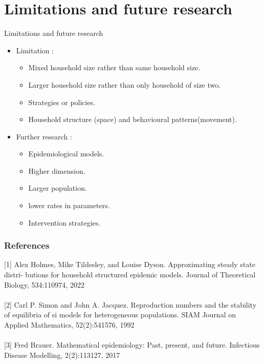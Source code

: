 \documentclass[smaller,aspectratio=169, toc=bibliography]{beamer}
\begin{document}
\section*{Limitations and future research}
\begin{frame}{Limitations and future research}
\begin{itemize}
\item Limitation : 
\begin{itemize}
\item Mixed household size rather than same household size. 
\item Larger household size rather than only household of size two. 
\item Strategies or policies. 
\item Household structure (space) and behavioural patterns(movement).  
\end{itemize}
\item Further research : 
\begin{itemize}
\item Epidemiological models. 
\item Higher dimension. 
\item Larger population. 
\item lower rates in parameters. 
\item Intervention strategies.
\end{itemize}
\end{itemize}
\end{frame}


\begin{frame}
\frametitle{References}

\scriptsize{[1] Alex Holmes, Mike Tildesley, and Louise Dyson. Approximating steady state distri-
butions for household structured epidemic models. Journal of Theoretical Biology,
534:110974, 2022}\\
~\\

\scriptsize{[2] Carl P. Simon and John A. Jacquez. Reproduction numbers and the stability of
equilibria of si models for heterogeneous populations. SIAM Journal on Applied
Mathematics, 52(2):541{576, 1992}}\\
~\\

\scriptsize{[3] Fred Brauer. Mathematical epidemiology: Past, present, and future. Infectious
Disease Modelling, 2(2):113{127, 2017}} \\

\end{frame}

\begin{frame}
\begin{center}
\textsc{}\\
\end{center}
\end{frame}
\end{document}
